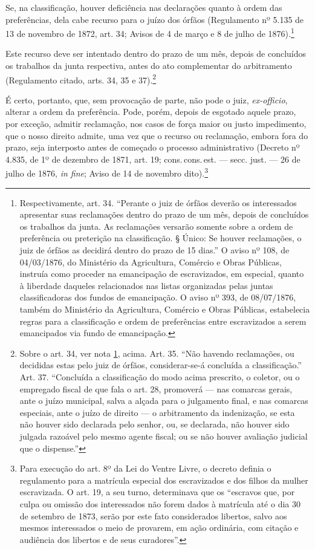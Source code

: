 {Se, na classificação, houver deficiência nas declarações quanto à ordem
das preferências, dela cabe recurso para o juízo dos órfãos (Regulamento
nº 5.135 de 13 de novembro de 1872, art. 34; Avisos de 4 de março e 8 de
julho de 1876).\footnote{Respectivamente, art. 34. ``Perante o juiz de \label{art34}
  órfãos deverão os interessados apresentar suas reclamações dentro do
  prazo de um mês, depois de concluídos os trabalhos da junta. As
  reclamações versarão somente sobre a ordem de preferência ou
  preterição na classificação. § Único: Se houver reclamações, o juiz de
  órfãos as decidirá dentro do prazo de 15 dias.'' O aviso nº 108, de
  04/03/1876, do Ministério da Agricultura, Comércio e Obras Públicas,
  instruía como proceder na emancipação de escravizados, em especial,
  quanto à liberdade daqueles relacionados nas listas organizadas pelas
  juntas classificadoras dos fundos de emancipação. O aviso nº 393, de
  08/07/1876, também do Ministério da Agricultura, Comércio e Obras
  Públicas, estabelecia regras para a classificação e ordem de
  preferências entre escravizados a serem emancipados via fundo de
  emancipação.}

Este recurso deve ser intentado dentro do prazo de um mês, depois de
concluídos os trabalhos da junta respectiva, antes do ato complementar
do arbitramento (Regulamento citado, arts. 34, 35 e 37).\footnote{
  Sobre o art. 34, ver nota \ref{art34}, acima. Art. 35. ``Não havendo reclamações, ou
  decididas estas pelo juiz de órfãos, considerar-se-á concluída a
  classificação.'' Art. 37. ``Concluída a classificação do modo acima
  prescrito, o coletor, ou o empregado fiscal de que fala o art. 28,
  promoverá --- nas comarcas gerais, ante o juízo municipal, salva a
  alçada para o julgamento final, e nas comarcas especiais, ante o juízo
  de direito --- o arbitramento da indenização, se esta não houver sido
  declarada pelo senhor, ou, se declarada, não houver sido julgada
  razoável pelo mesmo agente fiscal; ou se não houver avaliação judicial
  que o dispense.''}

É certo, portanto, que, sem provocação de parte, não pode o juiz,
\emph{ex-officio}, alterar a ordem da preferência. Pode, porém, depois
de esgotado aquele prazo, por exceção, admitir reclamação, nos casos de
força maior ou justo impedimento, que o nosso direito admite, uma vez
que o recurso ou reclamação, embora fora do prazo, seja interposto antes
de começado o processo administrativo (Decreto nº 4.835, de 1º de
dezembro de 1871, art. 19; cons.\,cons.\,est. --- secc. just. --- 26 de julho
de 1876, \emph{in fine}; Aviso de 14 de novembro dito).\footnote{Para
  execução do art. 8º da Lei do Ventre Livre, o decreto definia o
  regulamento para a matrícula especial dos escravizados e dos filhos da
  mulher escravizada. O art. 19, a seu turno, determinava que os
  ``escravos que, por culpa ou omissão dos interessados não forem dados à
  matrícula até o dia 30 de setembro de 1873, serão por este fato
  considerados libertos, salvo aos mesmos interessados o meio de
  provarem, em ação ordinária, com citação e audiência dos libertos e de
  seus curadores''.}

}
